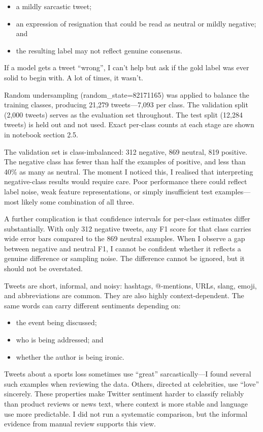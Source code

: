 \documentclass[12pt]{article}
\begin{document}
\begin{itemize}

  \item a mildly sarcastic tweet;

  \item an expression of resignation that could be read as neutral or mildly negative; and

  \item the resulting label may not reflect genuine consensus.

\end{itemize}

  If a model gets a tweet ``wrong'', I can't help but ask if the gold label was ever solid to begin with. A lot of times, it wasn't.

Random undersampling (random\_state=82171165) was applied to balance the training classes, producing 21,279 tweets---7,093 per class. The validation split (2,000 tweets) serves as the evaluation set throughout. The test split (12,284 tweets) is held out and not used. Exact per-class counts at each stage are shown in notebook section 2.5.

The validation set is class-imbalanced: 312 negative, 869 neutral, 819 positive. The negative class has fewer than half the examples of positive, and less than 40\% as many as neutral. The moment I noticed this, I realised that interpreting negative-class results would require care. Poor performance there could reflect label noise, weak feature representations, or simply insufficient test examples---most likely some combination of all three.

A further complication is that confidence intervals for per-class estimates differ substantially. With only 312 negative tweets, any F1 score for that class carries wide error bars compared to the 869 neutral examples. When I observe a gap between negative and neutral F1, I cannot be confident whether it reflects a genuine difference or sampling noise. The difference cannot be ignored, but it should not be overstated.

Tweets are short, informal, and noisy: hashtags, @-mentions, URLs, slang, emoji, and abbreviations are common. They are also highly context-dependent. The same words can carry different sentiments depending on:

\begin{itemize}

  \item the event being discussed;

  \item who is being addressed; and

  \item whether the author is being ironic.

\end{itemize} Tweets about a sports loss sometimes use ``great'' sarcastically---I found several such examples when reviewing the data. Others, directed at celebrities, use ``love'' sincerely. These properties make Twitter sentiment harder to classify reliably than product reviews or news text, where context is more stable and language use more predictable. I did not run a systematic comparison, but the informal evidence from manual review supports this view.
\end{document}
